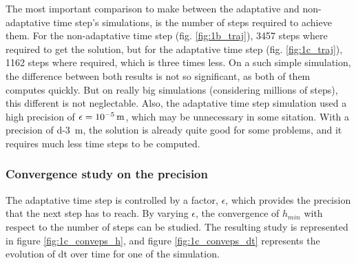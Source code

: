 \documentclass[a4paper,12pt,twoside]{article}
\begin{document}
The most important comparison to make between the adaptative and non-adaptative time step's simulations, is the number of steps required to achieve them.
For the non-adaptative time step (fig. \ref{fig:1b_traj}), \num{3457} steps where required to get the solution, but for the adaptative time step (fig. \ref{fig:1c_traj}), \num{1162} steps where required, which is three times less.
On a such simple simulation, the difference between both results is not so significant, as both of them computes quickly.
But on really big simulations (considering millions of steps), this different is not neglectable.
Also, the adaptative time step simulation used a high precision of $\epsilon=\SI{d-5}{\m}$, which may be unnecessary in some sitation.
With a precision of \SI{d-3}{\m}, the solution is already quite good for some problems, and it requires much less time steps to be computed.

\subsubsection{Convergence study on the precision}
The adaptative time step is controlled by a factor, $\epsilon$, which provides the precision that the next step has to reach.
By varying $\epsilon$, the convergence of $h_{min}$ with respect to the number of steps can be studied.
The resulting study is represented in figure \ref{fig:1c_conveps_h}, and figure \ref{fig:1c_conveps_dt} represents the evolution of dt over time for one of the simulation.
\end{document}
